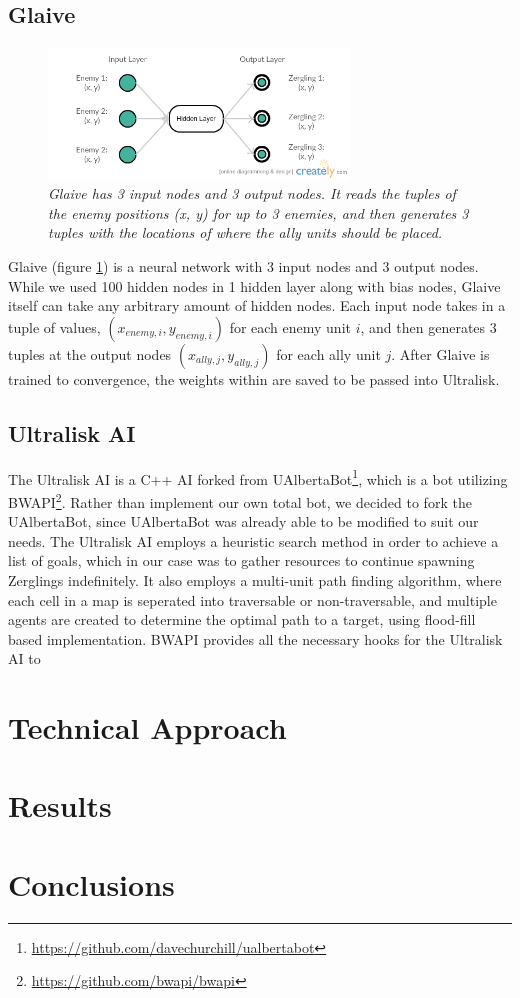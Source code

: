 \documentclass[twocolumn]{article}
\begin{document}
\subsection{Glaive}
\begin{figure}
	\begin{center}
		\includegraphics[width=8cm]{../plots/nnLayout.png}
	\end{center}
	\caption{\textit{Glaive has 3 input nodes and 3 output nodes. It reads the tuples of the enemy positions (x, y) for up to 3 enemies, and then generates 3 tuples with the locations of where the ally units should be placed. }}
	\label{fig:glaive}
\end{figure}
Glaive (figure \ref{fig:glaive}) is a neural network with 3 input nodes and 3 output nodes. While we used 100 hidden nodes in 1 hidden layer along with bias nodes, Glaive itself can take any arbitrary amount of hidden nodes. Each input node takes in a tuple of values, $(x_{enemy, i}, y_{enemy, i})$ for each enemy unit $i$, and then generates 3 tuples at the output nodes $(x_{ally, j}, y_{ally, j})$ for each ally unit $j$. After Glaive is trained to convergence, the weights within are saved to be passed into Ultralisk. 

\subsection{Ultralisk AI}
The Ultralisk AI is a C++ AI forked from UAlbertaBot\footnote{\tiny{\url{https://github.com/davechurchill/ualbertabot}}}, which is a bot utilizing BWAPI\footnote{\tiny{\url{https://github.com/bwapi/bwapi}}}. Rather than implement our own total bot, we decided to fork the UAlbertaBot, since UAlbertaBot was already able to be modified to suit our needs. The Ultralisk AI employs a heuristic search method in order to achieve a list of goals, which in our case was to gather resources to continue spawning Zerglings indefinitely. It also employs a multi-unit path finding algorithm, where each cell in a map is seperated into traversable or non-traversable, and multiple agents are created to determine the optimal path to a target, using flood-fill based implementation. BWAPI provides all the necessary hooks for the Ultralisk AI to 

\section{Technical Approach}
\section{Results}
\lipsum[3]
\section{Conclusions}
\lipsum[3]
\end{document}

